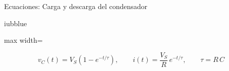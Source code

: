 \documentclass[aspectratio=169,11pt,xcolor={table}]{beamer}
\begin{document}
\begin{frame}{Ecuaciones: Carga y descarga del condensador}
\begin{cajaplana}{iubblue}
\centering
\begin{adjustbox}{max width=\linewidth}
\begin{minipage}{1.23\linewidth}
{\large
\begin{equation*}
  v_C(t) = V_S\left(1 - e^{-t/\tau}\right), \qquad i(t) = \frac{V_S}{R}\,e^{-t/\tau}, \qquad \tau = R\,C
\end{equation*}
}
\end{minipage}
\end{adjustbox}
\end{cajaplana}
\end{frame}
\end{document}
